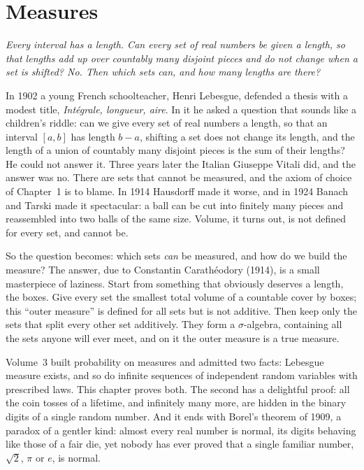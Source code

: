 \chapter{Measures}

\begin{center}\itshape
Every interval has a length. Can every set of real numbers be given a length, so that lengths add up over countably
many disjoint pieces and do not change when a set is shifted? No. Then which sets can, and how many lengths are there?
\end{center}

In 1902 a young French schoolteacher, Henri Lebesgue, defended a thesis with a modest title, \emph{Int\'egrale, longueur,
aire}. In it he asked a question that sounds like a children's riddle: can we give every set of real numbers a length, so that
an interval $[a,b]$ has length $b-a$, shifting a set does not change its length, and the length of a union of countably many
disjoint pieces is the sum of their lengths? He could not answer it. Three years later the Italian Giuseppe Vitali did, and the
answer was no. There are sets that cannot be measured, and the axiom of choice of Chapter~1 is to blame. In 1914 Hausdorff made it
worse, and in 1924 Banach and Tarski made it spectacular: a ball can be cut into finitely many pieces and reassembled into two balls of the
same size. Volume, it turns out, is not defined for every set, and cannot be.

So the question becomes: which sets \emph{can} be measured, and how do we build the measure? The answer, due to Constantin
Carath\'eodory (1914), is a small masterpiece of laziness. Start from something that obviously deserves a length, the boxes. Give
every set the smallest total volume of a countable cover by boxes; this ``outer measure'' is defined for all sets but is not
additive. Then keep only the sets that split every other set additively. They form a $\sigma$-algebra, containing all the sets anyone
will ever meet, and on it the outer measure is a true measure.

Volume~3 built probability on measures and admitted two facts: Lebesgue measure exists, and so do infinite sequences of
independent random variables with prescribed laws. This chapter proves both. The second has a delightful proof: all the coin tosses
of a lifetime, and infinitely many more, are hidden in the binary digits of a single random number. And it ends with Borel's
theorem of 1909, a paradox of a gentler kind: almost every real number is normal, its digits behaving like those of a fair
die, yet nobody has ever proved that a single familiar number, $\sqrt2$, $\pi$ or $e$, is normal.

